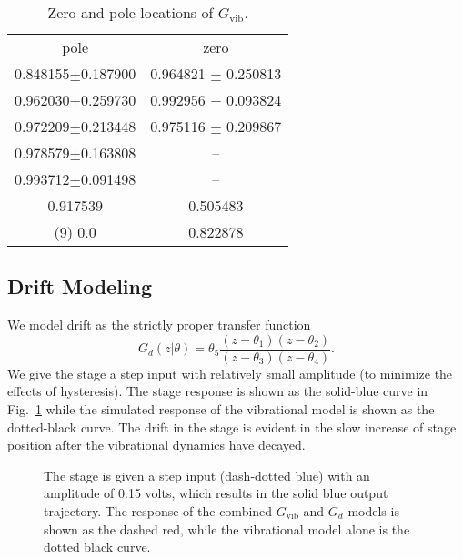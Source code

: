 \documentclass[twocolumn,twoside]{IEEEtran}
\newcommand{\Gv}{\ensuremath{G_{\text{vib}}}\xspace}
\begin{document}
\begin{table}
  \centering
  \caption{Zero and pole locations of $\Gv$. }
  \label{tab:pzgvib}
  \begin{tabular}{cc}
    pole & zero\\
    0.848155$\pm$0.187900 & 0.964821 $\pm$ 0.250813\\ 
    0.962030$\pm$0.259730 & 0.992956 $\pm$ 0.093824\\ 
    0.972209$\pm$0.213448 & 0.975116 $\pm$ 0.209867\\ 
    0.978579$\pm$0.163808 & --\\ 
    0.993712$\pm$0.091498 & --\\ 
    0.917539 & 0.505483 \\ 
    (9) 0.0 & 0.822878 \\ 
  \end{tabular}
\end{table}


\subsection{Drift Modeling}\label{sec:drift_model}




We model drift as the strictly proper transfer function
\begin{equation}
G_d(z|\theta) = \theta_5\frac{(z-\theta_1)(z-\theta_2)}{(z-\theta_3)(z-\theta_4)}.
\end{equation}
We give the stage a step input with relatively small amplitude (to minimize the effects of hysteresis). The stage response is shown as the solid-blue curve in Fig.~\ref{fig:drift_fit} while the simulated response of the vibrational model is shown as the dotted-black curve. The drift in the stage is evident in the slow increase of stage position after the vibrational dynamics have decayed. 

\begin{figure}
  
  \caption{The stage is given a step input (dash-dotted blue) with an amplitude of 0.15 volts, which results in the solid blue output trajectory. The response of the combined $\Gv$ and $G_{d}$ models is shown as the dashed red, while the vibrational model alone is the dotted black curve.}
  \label{fig:drift_fit}
\end{figure}
\end{document}
